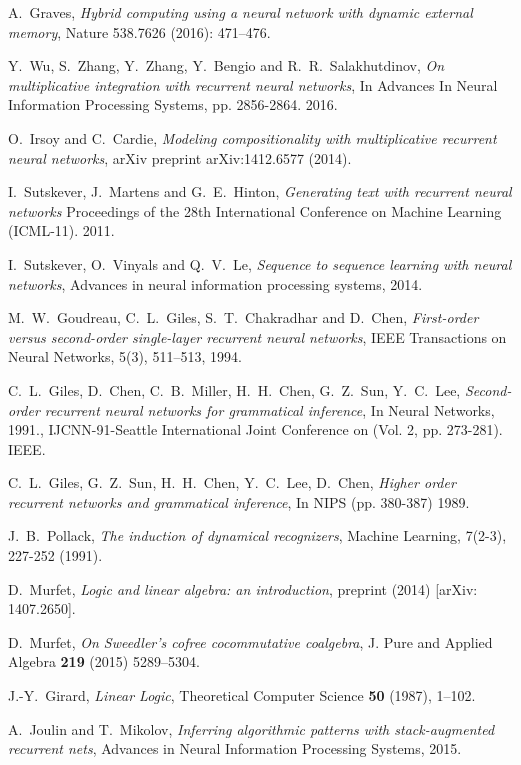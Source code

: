 \documentclass[english,letter paper,12pt,leqno]{article}
\theoremstyle{example}
\numberwithin{equation}{section}
\begin{document}
\begin{thebibliography}{BHLS03}
A.~Graves, \textsl{Hybrid computing using a neural network with dynamic external memory}, Nature 538.7626 (2016): 471--476.

Y.~Wu, S.~Zhang, Y.~Zhang, Y.~Bengio and R.~R.~Salakhutdinov, \textsl{On multiplicative integration with recurrent neural networks}, In Advances In Neural Information Processing Systems, pp. 2856-2864. 2016.

O.~Irsoy and C.~Cardie, \textsl{Modeling compositionality with multiplicative recurrent neural networks}, arXiv preprint arXiv:1412.6577 (2014).

I.~Sutskever, J.~Martens and G.~E.~Hinton, \textsl{Generating text with recurrent neural networks} Proceedings of the 28th International Conference on Machine Learning (ICML-11). 2011.

I.~Sutskever, O.~Vinyals and Q.~V.~Le, \textsl{Sequence to sequence learning with neural networks}, Advances in neural information processing systems, 2014.

M.~W.~Goudreau, C.~L.~Giles, S.~T.~Chakradhar and D.~Chen, \textsl{First-order versus second-order single-layer recurrent neural networks}, IEEE Transactions on Neural Networks, 5(3), 511--513, 1994.

C.~L.~Giles, D.~Chen, C.~B.~Miller, H.~H.~Chen, G.~Z.~Sun, Y.~C.~Lee, \textsl{Second-order recurrent neural networks for grammatical inference}, In Neural Networks, 1991., IJCNN-91-Seattle International Joint Conference on (Vol. 2, pp. 273-281). IEEE.

C.~L.~Giles, G.~Z.~Sun, H.~H.~Chen, Y.~C.~Lee, D.~Chen, \textsl{Higher order recurrent networks and grammatical inference}, In NIPS (pp. 380-387) 1989.

J.~B.~Pollack, \textsl{The induction of dynamical recognizers}, Machine Learning, 7(2-3), 227-252 (1991). 

D.~Murfet, \textsl{Logic and linear algebra: an introduction}, preprint (2014) [arXiv: 1407.2650].

D.~Murfet, \textsl{On Sweedler's cofree cocommutative coalgebra}, J. Pure and Applied Algebra \textbf{219} (2015) 5289--5304.

J.-Y.~Girard, \textsl{Linear Logic}, Theoretical Computer Science \textbf{50} (1987), 1--102.

A.~Joulin and T.~Mikolov, \textsl{Inferring algorithmic patterns with stack-augmented recurrent nets}, Advances in Neural Information Processing Systems, 2015.


\end{thebibliography}
\end{document}
